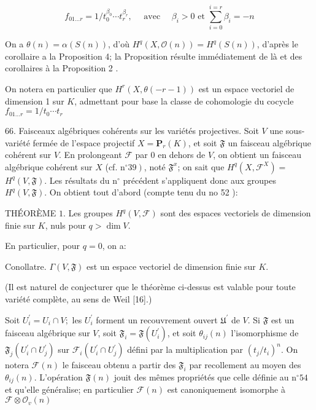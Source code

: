 $$
f_{01 \ldots r}=1 / t_{0}^{\beta_{0}} \cdots t_{r}^{\beta_{r}}, \quad \text { avec } \quad \beta_{i}>0 \text { et } \sum_{i=0}^{i=r} \beta_{i}=-n
$$

On a $\theta(n)=\alpha(S(n))$, d'où $H^{q}(X, \mathcal{O}(n))=H^{q}(S(n))$, d'après le corollaire a la Proposition 4; la Proposition résulte immédiatement de là et des corollaires à la Proposition 2 .

On notera en particulier que $H^{r}(X, \theta(-r-1))$ est un espace vectoriel de dimension 1 sur $K$, admettant pour base la classe de cohomologie du cocycle $f_{01 \ldots r}=1 / t_{0} \cdots t_{r}$

66. Faisceaux algébriques cohérents sur les variétés projectives. Soit $V$ une sous-variété fermée de l'espace projectif $X=\mathbf{P}_{r}(K)$, et soit $\mathfrak{F}$ un faisceau algébrique cohérent sur $V$. En prolongeant $\mathcal{F}$ par 0 en dehors de $V$, on obtient un faisceau algébrique cohérent sur $X$ (cf. $\left.\mathrm{n}^{\circ} 39\right)$, noté $\mathfrak{F}^{x}$; on sait que $H^{q}\left(X, \mathcal{F}^{X}\right)=$ $H^{q}(V, \mathfrak{F})$. Les résultats du $\mathrm{n}^{\circ}$ précédent s'appliquent donc aux groupes $H^{q}(V, \mathfrak{F}) .$ On obtient tout d'abord (compte tenu du no 52 ):

THÉORÈME $1 .$ Les groupes $H^{q}(V, \mathcal{F})$ sont des espaces vectoriels de dimension finie sur $K$, nuls pour $q>\operatorname{dim} V$.

En particulier, pour $q=0$, on a:

Conollatre. $\Gamma(V, \mathfrak{F})$ est un espace vectoriel de dimension finie sur $K$.

(Il est naturel de conjecturer que le théorème ci-dessus est valable pour toute variété complète, au sens de Weil [16].)

Soit $U_{i}^{\prime}=U_{i} \cap V ;$ les $U_{i}^{\prime}$ forment un recouvrement ouvert $\mathfrak{U}^{\prime}$ de $V .$ Si $\mathfrak{F}$ est un faisceau algébrique sur $V$, soit $\mathfrak{F}_{i}=\mathfrak{F}\left(U_{i}^{\prime}\right)$, et soit $\theta_{i j}(n)$ l'isomorphisme de $\mathfrak{F}_{j}\left(U_{i}^{\prime} \cap U_{j}^{\prime}\right)$ sur $\mathcal{F}_{i}\left(U_{i}^{\prime} \cap U_{j}^{\prime}\right)$ défini par la multiplication par $\left(t_{j} / t_{i}\right)^{n} .$ On notera $\mathcal{F}(n)$ le faisceau obtenu a partir des $\mathfrak{F}_{i}$ par recollement au moyen des $\theta_{i j}(n) .$ L'opération $\mathfrak{F}(n)$ jouit des mêmes propriétés que celle définie au $\mathrm{n}^{\circ} 54$ et qu'elle généralise; en particulier $\mathcal{F}(n)$ est canoniquement isomorphe à $\mathcal{F} \otimes \mathcal{O}_{v}(n)$

